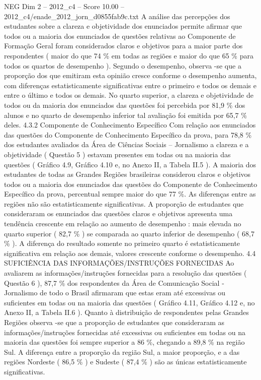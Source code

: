 \begin{textsample}{NEG Dim 2 – 2012\_c4 – Score 10.00 – 2012\_c4/enade\_2012\_jorn\_d0855fab9c.txt}
A análise das percepções dos estudantes sobre a clareza e objetividade dos enunciados permite afirmar que todos ou a maioria dos enunciados de questões relativas ao Componente de Formação Geral foram considerados claros e objetivos para a maior parte dos respondentes ( maior do que 74 \% em todas as regiões e maior do que 65 \% para todos os quartos de desempenho ).
Segundo o desempenho, observa -se que a proporção dos que emitiram esta opinião cresce conforme o desempenho aumenta, com diferenças estatisticamente significativas entre o primeiro e todos os demais e entre o último e todos os demais.
No quarto superior, a clareza e objetividade de todos ou da maioria dos enunciados das questões foi percebida por 81,9 \% dos alunos e no quarto de desempenho inferior tal avaliação foi emitida por 65,7 \% deles. 4.3.2 Componente de Conhecimento Específico Com relação aos enunciados das questões do Componente de Conhecimento Específico da prova, para 78,8 \% dos estudantes avaliados da Área de Ciências Sociais – Jornalismo a clareza e a objetividade ( Questão 5 ) estavam presentes em todas ou na maioria das questões ( Gráfico 4.9, Gráfico 4.10 e, no Anexo II, a Tabela II.5 ).
A maioria dos estudantes de todas as Grandes Regiões brasileiras considerou claros e objetivos todos ou a maioria dos enunciados das questões do Componente de Conhecimento Específico da prova, percentual sempre maior do que 77 \%.
As diferenças entre as regiões não são estatisticamente significativas.
A proporção de estudantes que consideraram os enunciados das questões claros e objetivos apresenta uma tendência crescente em relação ao aumento de desempenho : mais elevada no quarto superior ( 82,7 \% ) se comparada ao quarto inferior de desempenho ( 68,7 \% ).
A diferença do resultado somente no primeiro quarto é estatisticamente significativa em relação aos demais, valores crescente conforme o desempenho. 4.4 SUFICIÊNCIA DAS INFORMAÇÕES/INSTRUÇÕES FORNECIDAS Ao avaliarem as informações/instruções fornecidas para a resolução das questões ( Questão 6 ), 87,7 \% dos respondentes da Área de Comunicação Social - Jornalismo de todo o Brasil afirmaram que estas eram até excessivas ou suficientes em todas ou na maioria das questões ( Gráfico 4.11, Gráfico 4.12 e, no Anexo II, a Tabela II.6 ).
Quanto à distribuição de respondentes pelas Grandes Regiões observa -se que a proporção de estudantes que consideraram as informações/instruções fornecidas até excessivas ou suficientes em todas ou na maioria das questões foi sempre superior a 86 \%, chegando a 89,8 \% na região Sul.
A diferença entre a proporção da região Sul, a maior proporção, e a das regiões Nordeste ( 86,5 \% ) e Sudeste ( 87,4 \% ) são as únicas estatisticamente significativas.

\end{textsample}
